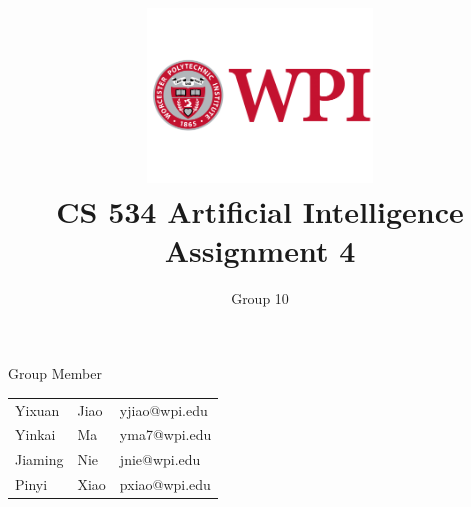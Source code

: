 \documentclass[11pt, a4paper]{article}
\title{\includegraphics[width=0.45\textwidth]{wpi2}
        \\CS 534 Artificial Intelligence \\ Assignment 4 }          %
\author{Group 10 }                    %
\begin{document}
\begin{titlepage}
	
\maketitle
{} %

\begin{center}
Group Member
\end{center}

\begin{table}[htbp] 
\begin{center}
\begin{tabular}{l l l} 
	 
	 Yixuan & Jiao  &   yjiao@wpi.edu \\
     Yinkai & Ma  &   yma7@wpi.edu \\
     Jiaming & Nie  &  jnie@wpi.edu \\
     Pinyi & Xiao  &  pxiao@wpi.edu \\
\end{tabular}
\end{center}
\end{table}



\thispagestyle{empty}  %

\end{titlepage}














  
 





\end{document}
